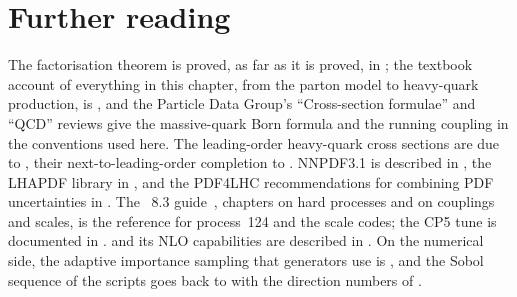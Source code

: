 \section{Further reading}
\label{sec:ancestral_home:further_reading}
The factorisation theorem is proved, as far as it is proved, in
\cite{Collins:1989gx}; the textbook account of everything in this chapter,
from the parton model to heavy-quark production, is \cite{Ellis:1996mzs},
and the Particle Data Group's ``Cross-section formulae'' and ``QCD'' reviews
\cite{ParticleDataGroup:2024cfk} give the massive-quark Born formula and the
running coupling in the conventions used here. The leading-order
heavy-quark cross sections are due to \cite{Combridge:1978kx}, their
next-to-leading-order completion to \cite{Nason:1987xz}. NNPDF3.1 is
described in \cite{NNPDF:2017mvq}, the LHAPDF library in
\cite{Buckley:2014ana}, and the PDF4LHC recommendations for combining PDF
uncertainties in \cite{Butterworth:2015oua}. The \PYTHIA~8.3
guide~\cite{Bierlich:2022pfr}, chapters on hard processes and on couplings
and scales, is the reference for process~124 and the scale codes; the CP5
tune is documented in \cite{CMS:2019csb}. \MG and its NLO capabilities are
described in \cite{Alwall:2014hca}. On the numerical side, the adaptive
importance sampling that generators use is \cite{Lepage:1977sw}, and the
Sobol sequence of the scripts goes back to \cite{Sobol:1967} with the
direction numbers of \cite{Joe:2008}.

